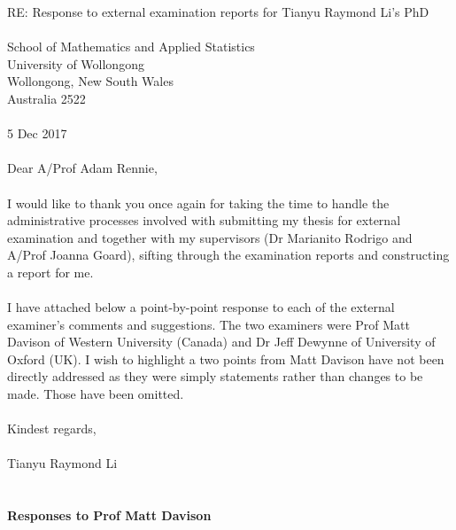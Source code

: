 \documentclass{article}
\begin{document}
RE: Response to external examination reports for Tianyu Raymond Li's PhD
\\
\\
School of Mathematics and Applied Statistics \\
University of Wollongong \\
Wollongong, New South Wales \\
Australia 2522
\\
\\
5 Dec 2017
\\
\\
Dear A/Prof Adam Rennie,
\\
\\
I would like to thank you once again for taking the time to handle the administrative processes involved with submitting my thesis for external examination and together with my supervisors (Dr Marianito Rodrigo and A/Prof Joanna Goard), sifting through the examination reports and constructing a report for me. 
\\
\\
I have attached below a point-by-point response to each of the external examiner's comments and suggestions. The two examiners were Prof Matt Davison of Western University (Canada) and Dr Jeff Dewynne of University of Oxford (UK). I wish to highlight a two points from Matt Davison have not been directly addressed as they were simply statements rather than changes to be made. Those have been omitted.
\\
\\
Kindest regards,
\\
\\
Tianyu Raymond Li
\\
\\
\\
\textbf{Responses to Prof Matt Davison\\ \\}
\end{document}
